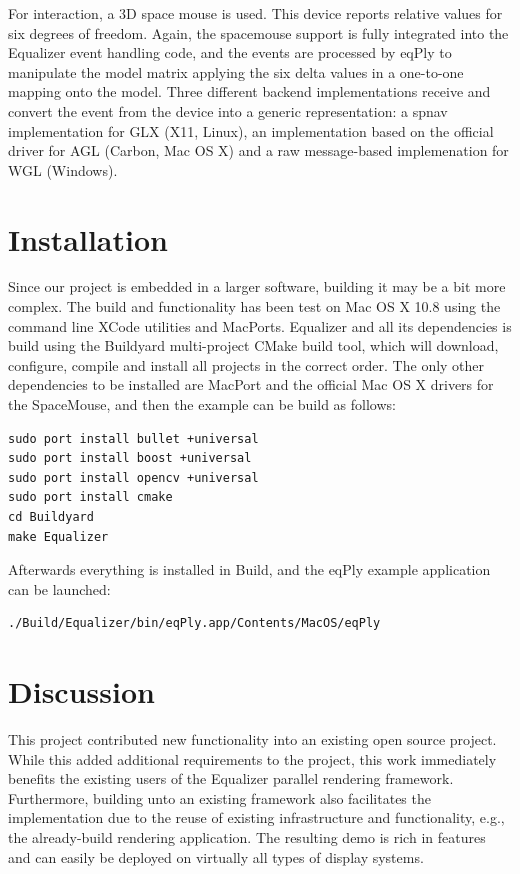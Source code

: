 \documentclass[10pt,a4]{scrartcl}
\newcommand{\fix}[1]{\textbf{\color{red}{#1}}}
\begin{document}
For interaction, a 3D space mouse is used. This device reports relative values
for six degrees of freedom. Again, the spacemouse support is fully integrated
into the Equalizer event handling code, and the events are processed by
\textsf{eqPly} to manipulate the model matrix applying the six delta values in a
one-to-one mapping onto the model. Three different backend implementations
receive and convert the event from the device into a generic representation: a
\textsf{spnav} implementation for GLX (X11, Linux), an implementation based on
the official driver for AGL (Carbon, Mac OS X) and a raw message-based
implemenation for WGL (Windows).


\section{Installation}

Since our project is embedded in a larger software, building it may be a bit
more complex. The build and functionality has been test on Mac OS X 10.8 using
the command line XCode utilities and MacPorts. Equalizer and all its
dependencies is build using the Buildyard multi-project CMake build tool, which
will download, configure, compile and install all projects in the correct
order. The only other dependencies to be installed are MacPort and the official
Mac OS X drivers for the SpaceMouse, and then the example can be build as
follows:

\begin{lstlisting}
sudo port install bullet +universal
sudo port install boost +universal
sudo port install opencv +universal
sudo port install cmake
cd Buildyard
make Equalizer
\end{lstlisting}

Afterwards everything is installed in \textsf{Build}, and the \textsf{eqPly}
example application can be launched:

\begin{lstlisting}
./Build/Equalizer/bin/eqPly.app/Contents/MacOS/eqPly
\end{lstlisting}

\section{Discussion}

This project contributed new functionality into an existing open source
project. While this added additional requirements to the project, this work
immediately benefits the existing users of the Equalizer parallel rendering
framework. Furthermore, building unto an existing framework also facilitates the
implementation due to the reuse of existing infrastructure and functionality,
e.g., the already-build rendering application. The resulting demo is rich in
features and can easily be deployed on virtually all types of display systems.
\end{document}
